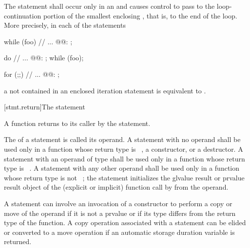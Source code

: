 \pnum
The
statement shall occur only in an
%
and causes control to pass to the loop-continuation portion of the
smallest enclosing , that is, to the end
of the loop. More precisely, in each of the statements\newline
\begin{minipage}{.30\hsize}
\begin{codeblock}
while (foo) {
  {
    // ...
  }
@@: ;
}
\end{codeblock}
\end{minipage}
\begin{minipage}{.30\hsize}
\begin{codeblock}
do {
  {
    // ...
  }
@@: ;
} while (foo);
\end{codeblock}
\end{minipage}
\begin{minipage}{.30\hsize}
\begin{codeblock}
for (;;) {
  {
    // ...
  }
@@: ;
}
\end{codeblock}
\end{minipage}
a  not contained in an enclosed iteration statement is
equivalent to  .

[stmt.return]{The  statement}%
%
%

\pnum
A function returns to its caller by the  statement.

\pnum
The 
of a  statement is called its operand. A  statement with
no operand shall be used only in a function whose return type is
\cv{}~, a constructor, or a
destructor.
%
%
A  statement with an operand of type  shall be used only
in a function whose return type is \cv{}~.
A  statement with any other operand shall be used only
in a function whose return type is not \cv{}~;
%
the  statement initializes the
glvalue result or prvalue result object of the (explicit or implicit) function call
by  from the operand.
\begin{note}
A  statement can involve
an invocation of a constructor to perform a copy or move of the operand
if it is not a prvalue or if its type differs from the return type of the function.
A copy operation associated with a  statement can be elided or
converted to a move operation if an automatic storage duration variable is returned.
\end{note}

